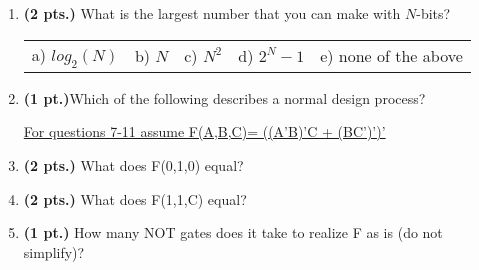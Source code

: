 \documentclass{article}
\begin{document}
\begin{enumerate}
\item {\bf (2 pts.)} What is the largest number that you can make with $N$-bits?

\begin{tabular}{p{0.7in} p{0.7in} p{0.7in} p{0.7in} l}
a) $log_2(N)$ & b) $N$ & c) $N^2$ & d) $2^N-1$ & e) none of the above
\end{tabular}

\item {\bf (1 pt.)}Which of the following describes a normal
design process?

\pagebreak

\underline{For questions 7-11 assume F(A,B,C)= ((A'B)'C + (BC')')' }

\item {\bf (2 pts.)} What does F(0,1,0) equal?

\item {\bf (2 pts.)} What does F(1,1,C) equal?

\item {\bf (1 pt.)} How many NOT gates does it take to realize F
as is (do not simplify)?


\end{enumerate}
\end{document}

